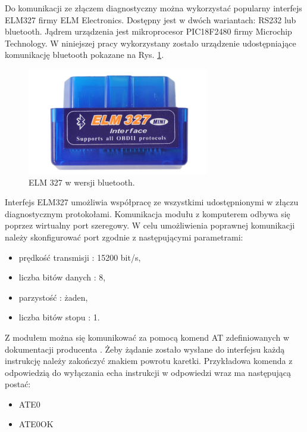 \documentclass[12pt]{article} %
\numberwithin{equation}{subsection}
\numberwithin{figure}{section}
\numberwithin{table}{section}
\begin{document}
	\hspace{0.5cm}Do komunikacji ze złączem diagnostyczny można wykorzystać popularny interfejs ELM327 firmy ELM Electronics. Dostępny jest w dwóch wariantach: RS232 lub bluetooth. Jądrem urządzenia jest mikroprocesor PIC18F2480 firmy Microchip Technology. W niniejszej pracy wykorzystany zostało urządzenie udostępniające komunikację bluetooth pokazane na Rys. \ref{rys_elm327}.
	
	\begin{figure}[ht]
		\centering
		\includegraphics[scale=1]{Images/rys_elm327.png}
		\caption{ELM 327 w wersji bluetooth.}
		\label{rys_elm327}
		\end{figure}
	
	Interfejs ELM327 umożliwia współpracę ze wszystkimi udostępnionymi w złączu diagnostycznym protokołami. Komunikacja modułu z komputerem odbywa się poprzez wirtualny port szeregowy. W celu umożliwienia poprawnej komunikacji należy skonfigurować port zgodnie z następującymi parametrami:
	
	\begin{itemize}
		\item{prędkość transmisji : 15200 bit/s,}
		\item{liczba bitów danych : 8,}
		\item{parzystość : żaden,}
		\item{liczba bitów stopu : 1.}
	\end{itemize}	
	
	Z modułem można się komunikować za pomocą komend AT zdefiniowanych w dokumentacji producenta \cite{elm327}. Żeby żądanie zostało wysłane do interfejsu każdą instrukcję należy zakończyć znakiem powrotu karetki. Przykładowa komenda z odpowiedzią do wyłączania echa instrukcji w odpowiedzi wraz ma następującą postać:
	
	\begin{itemize}
		\item{ATE0}
		\item{ATE0OK}
	\end{itemize}	
	
\end{document}

